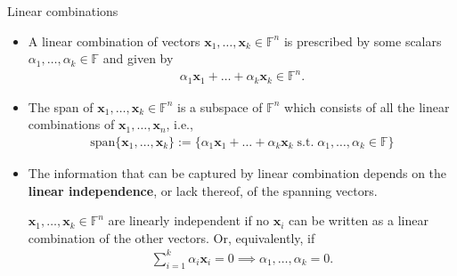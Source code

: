 \documentclass[t,usepdftitle=false]{beamer}
\begin{document}
\begin{frame}{Linear combinations}
\begin{itemize}
\item A linear combination of vectors $\mathbf{x}_1,\dots,\mathbf{x}_k\in\mathbb{F}^n$ is prescribed by some scalars $\alpha_1,\dots,\alpha_k\in\mathbb{F}$ and given by
\begin{align*}
\alpha_1\mathbf{x}_1+\dots+\alpha_k\mathbf{x}_k\in\mathbb{F}^n.
\end{align*}
\item The span of $\mathbf{x}_1,\dots,\mathbf{x}_k\in\mathbb{F}^n$ is a subspace of $\mathbb{F}^n$ which consists of all the linear combinations of $\mathbf{x}_1,\dots,\mathbf{x}_n$, i.e.,
\begin{align*}
\text{span}\{\mathbf{x}_1,\dots,\mathbf{x}_k\}:=
\{
\alpha_1\mathbf{x}_1+\dots+\alpha_k\mathbf{x}_k
\;\text{s.t.}\;
\alpha_1,\dots,\alpha_k\in\mathbb{F}
\}
\end{align*}
\item The information that can be captured by linear combination depends on the \textbf{linear independence}, or lack thereof, of the spanning vectors.
\begin{definition}
$\mathbf{x}_1,\dots,\mathbf{x}_k\in\mathbb{F}^n$ are linearly independent if no $\mathbf{x}_i$ can be written as a linear combination of the other vectors.
Or, equivalently, if\vspace{-.3cm}
\begin{align*}
\sum_{i=1}^k\alpha_i\mathbf{x}_i=0\implies\alpha_1,\dots,\alpha_k=0.
\end{align*}
\end{definition}
\end{itemize}
\end{frame}
\end{document}
